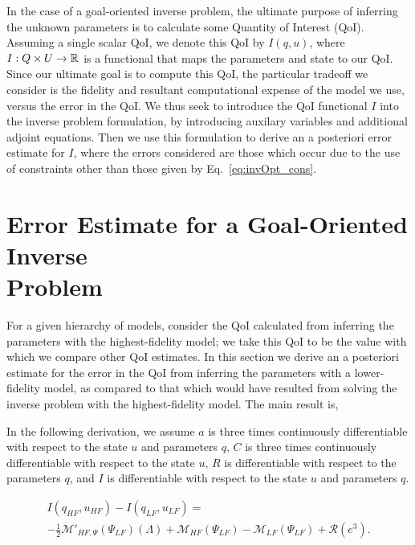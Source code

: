 In the case of a goal-oriented inverse problem, the ultimate purpose of inferring the unknown parameters is to calculate some Quantity of Interest (QoI). Assuming a single scalar QoI, we denote this QoI by $I(q,u)$, where $I:Q\times U\to{\mathbb{R}}$ is a functional that maps the parameters and state to our QoI. Since our ultimate goal is to compute this QoI, the particular tradeoff we consider is the fidelity and resultant computational expense of the model we use, versus the error in the QoI. We thus seek to introduce the QoI functional $I$ into the inverse problem formulation, by introducing auxilary variables and additional adjoint equations. Then we use this formulation to derive an a posteriori error estimate for $I$, where the errors considered are those which occur due to the use of constraints other than those given by Eq.~\eqref{eq:invOpt_cons}.
%
\section[Error Estimate for a Goal-Oriented Inverse Problem]{Error Estimate for a Goal-Oriented Inverse \\Problem}  \label{sec:deriv}
%
For a given hierarchy of models, consider the QoI calculated from inferring the parameters with the highest-fidelity model; we take this QoI to be the value with which we compare other QoI estimates. In this section we derive an a posteriori estimate for the error in the QoI from inferring the parameters with a lower-fidelity model, as compared to that which would have resulted from solving the inverse problem with the highest-fidelity model. The main result is,
%
\begin{theorem}
\label{thm:error_estimate}
In the following derivation, we assume $a$ is three times continuously differentiable with respect to the state $u$ and parameters $q$, $C$ is three times continuously differentiable with respect to the state $u$, $R$ is differentiable with respect to the parameters $q$, and $I$ is differentiable with respect to the state $u$ and parameters $q$.

\begin{multline}
I(q_{HF},u_{HF})-I(q_{LF},u_{LF})=\\-\frac{1}{2}\mathcal{M}'_{HF,\Psi}(\Psi_{LF})(\Lambda)+\mathcal M_{HF}(\Psi_{LF})-\mathcal M_{LF}(\Psi_{LF})+\mathcal{R}(e^3).
\label{eq:finErrExp}
\end{multline}
\end{theorem}
%



